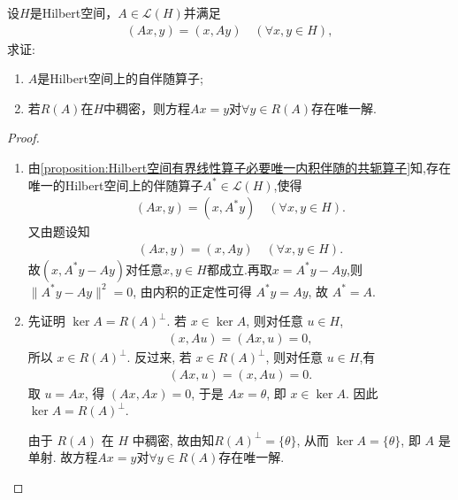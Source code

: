 \documentclass[../../main.tex]{subfiles}%
\begin{document}
\begin{example}
设$H$是Hilbert空间，$A\in\mathscr{L}(H)$并满足
\begin{align*}
(Ax,y)=(x,Ay)\quad(\forall x,y\in H),
\end{align*}
求证:
\begin{enumerate}[(1)]
\item $A$是Hilbert空间上的自伴随算子;
\item 若$R(A)$在$H$中稠密，则方程$Ax=y$对$\forall y\in R(A)$存在唯一解.
\end{enumerate}
\end{example}
\begin{proof}
\begin{enumerate}[(1)]
\item 由\cref{proposition:Hilbert空间有界线性算子必要唯一内积伴随的共轭算子}知,存在唯一的Hilbert空间上的伴随算子$A^*\in \mathscr{L}(H)$,使得
\begin{align*}
(Ax,y)=(x,A^*y)\quad(\forall x,y\in H).
\end{align*}
又由题设知
\begin{align*}
(Ax,y)=(x,Ay)\quad(\forall x,y\in H).
\end{align*}
故$(x,A^*y-Ay)$对任意$x,y\in H$都成立.再取$x=A^*y-Ay$,则$\|A^*y-Ay\|^2=0$,
由内积的正定性可得 $A^*y=Ay$, 故 $A^*=A$.

\item 先证明 $\ker A=R(A)^\perp$. 若 $x\in\ker A$, 则对任意 $u\in H$,
\begin{align*}
(x,Au)=(Ax,u)=0,
\end{align*}
所以 $x\in R(A)^\perp$. 反过来, 若 $x\in R(A)^\perp$, 则对任意 $u\in H$,有
\begin{align*}
(Ax,u)=(x,Au)=0.
\end{align*}
取 $u=Ax$, 得 $(Ax,Ax)=0$, 于是 $Ax=\theta$, 即 $x\in\ker A$. 因此 $\ker A=R(A)^\perp$.

由于 $R(A)$ 在 $H$ 中稠密, 故由知$R(A)^\perp=\{\theta\}$, 从而 $\ker A=\{\theta\}$, 即 $A$ 是单射.
故方程$Ax=y$对$\forall y\in R(A)$存在唯一解.
\end{enumerate}
\end{proof}
\end{document}
